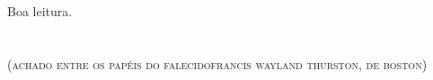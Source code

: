 Boa leitura.



%
%

\chapter*{}
\thispagestyle{plain}
\begin{center}
\begin{vplace}[0.3]
\Large
{}\break\normalsize\textsc{(achado entre os papéis do falecido\break francis wayland thurston, de boston)}
\end{vplace}
\end{center}



